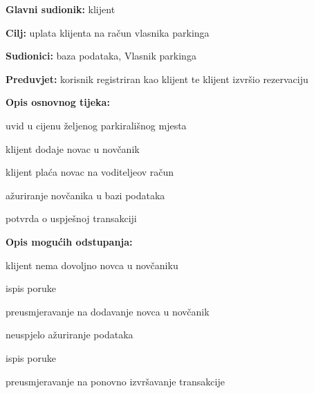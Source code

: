     			\begin{packed_item}
    				
    				\item \textbf{Glavni sudionik: } klijent
    				\item  \textbf{Cilj:} uplata klijenta na račun vlasnika parkinga
    				\item  \textbf{Sudionici:} baza podataka, Vlasnik parkinga
    				\item  \textbf{Preduvjet:} korisnik registriran kao klijent te klijent izvršio rezervaciju
    				\item  \textbf{Opis osnovnog tijeka:}
    				
    				\item[] \begin{packed_enum}
    					
    					\item uvid u cijenu željenog parkirališnog mjesta
    					\item klijent dodaje novac u novčanik
    					\item klijent plaća novac na voditeljeov račun
    					\item ažuriranje novčanika u bazi podataka
    					\item potvrda o uspješnoj transakciji

    				\end{packed_enum}
    				
    				\item  \textbf{Opis mogućih odstupanja:}
    				
    				\item[] \begin{packed_item}
    					
    					\item[2.a] klijent nema dovoljno novca u novčaniku
    					\item[] \begin{packed_enum}
    						
    						\item ispis poruke
    						\item preusmjeravanje na dodavanje novca u novčanik
    						
    					\end{packed_enum}
    					\item[3.a] neuspjelo ažuriranje podataka
						\item[] \begin{packed_enum}
							
							\item ispis poruke
							\item preusmjeravanje na ponovno izvršavanje transakcije
							
						\end{packed_enum}
    					
    				\end{packed_item}
    			\end{packed_item}
